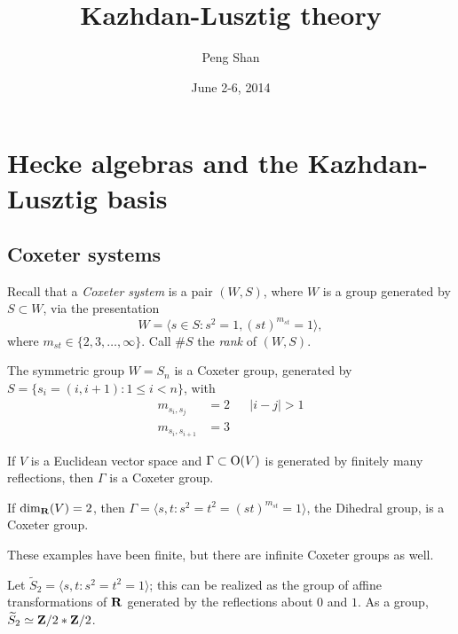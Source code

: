 \documentclass{article}
\title{Kazhdan-Lusztig theory}
\author{Peng Shan}
\date{June 2-6, 2014}
\begin{document}
\maketitle





\section{Hecke algebras and the Kazhdan-Lusztig basis}


\subsection{Coxeter systems}

Recall that a \emph{Coxeter system} is a pair $(W,S)$, where $W$ is a group 
generated by $S\subset W$, via the presentation 
\[
  W = \langle s\in S:s^2 = 1, (s t)^{m_{s t}} = 1\rangle ,
\]
where $m_{s t}\in \{2,3,\ldots,\infty\}$. Call $\# S$ the \emph{rank} of 
$(W,S)$. 

\begin{example}
The symmetric group $W=S_n$ is a Coxeter group, generated by 
$S=\{s_i=(i, i+1):1\leqslant i<n\}$, with 
\begin{align*}
  m_{s_i,s_j} &= 2 && |i-j|>1 \\
  m_{s_i,s_{i+1}} &= 3 
\end{align*}
\end{example}

\begin{example}
If $V$ is a Euclidean vector space and 
$\Gamma\subset \operatorname{O}(V)$ is generated by finitely many reflections, then 
$\Gamma$ is a Coxeter group. 
\end{example}

\begin{example}
If $\dim_{\mathbf{R}}(V)=2$, then $\Gamma=\langle s,t:s^2=t^2=(s t)^{m_{s t}} = 1\rangle$, 
the Dihedral group, is a Coxeter group. 
\end{example}

These examples have been finite, but there are infinite Coxeter groups as well. 

\begin{example}
Let $\widetilde S_2=\langle s,t:s^2=t^2=1\rangle$; this can be realized as the 
group of affine transformations of $\mathbf{R}$ generated by the reflections about 
$0$ and $1$. As a group, $\widetilde S_2\simeq \mathbf{Z}/2\ast \mathbf{Z}/2$. 
\end{example}
\end{document}
